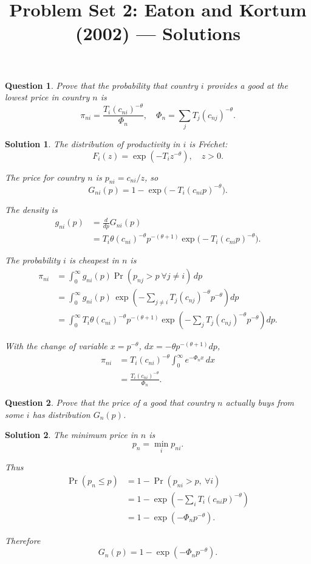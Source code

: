 \documentclass[12pt]{article}
\title{Problem Set 2: Eaton and Kortum (2002) --- Solutions}
\author{}
\date{}
\newtheorem{question}{Question}
\newtheorem*{solution}{Solution}
\begin{document}
\maketitle

\begin{question}
Prove that the probability that country $i$ provides a good at the lowest price in country $n$ is
\[
\pi_{ni} = \frac{T_i (c_{ni})^{-\theta}}{\Phi_n}, \quad
\Phi_n = \sum_j T_j (c_{nj})^{-\theta}.
\]
\end{question}

\begin{solution}
The distribution of productivity in $i$ is Fréchet:
\[
F_i(z) = \exp(-T_i z^{-\theta}), \quad z > 0.
\]

The price for country $n$ is $p_{ni} = c_{ni}/z$, so
\[
G_{ni}(p) = 1 - \exp\!\big(-T_i (c_{ni} p)^{-\theta}\big).
\]

The density is
\begin{align*}
g_{ni}(p) 
&= \frac{d}{dp} G_{ni}(p) \\
&= T_i \theta (c_{ni})^{-\theta} p^{-(\theta+1)} 
    \exp\!\big(-T_i (c_{ni} p)^{-\theta}\big).
\end{align*}

The probability $i$ is cheapest in $n$ is
\begin{align*}
\pi_{ni} &= \int_0^\infty g_{ni}(p) 
    \Pr(p_{nj} > p \ \forall j \neq i)\, dp \\
&= \int_0^\infty g_{ni}(p)\,
    \exp\!\left(-\sum_{j \neq i} T_j (c_{nj})^{-\theta} p^{-\theta}\right) dp \\
&= \int_0^\infty T_i \theta (c_{ni})^{-\theta} p^{-(\theta+1)} 
    \exp\!\left(-\sum_{j} T_j (c_{nj})^{-\theta} p^{-\theta}\right) dp.
\end{align*}

With the change of variable $x = p^{-\theta}$, $dx = -\theta p^{-(\theta+1)} dp$,
\begin{align*}
\pi_{ni} &= T_i (c_{ni})^{-\theta} 
    \int_0^\infty e^{-\Phi_n x} \, dx \\
&= \frac{T_i (c_{ni})^{-\theta}}{\Phi_n}.
\end{align*}
\end{solution}

\begin{question}
Prove that the price of a good that country $n$ actually buys from some $i$ has distribution $G_n(p)$.
\end{question}

\begin{solution}
The minimum price in $n$ is
\[
p_n = \min_i p_{ni}.
\]

Thus
\begin{align*}
\Pr(p_n \leq p) 
&= 1 - \Pr(p_{ni} > p, \ \forall i) \\
&= 1 - \exp\!\left(-\sum_i T_i (c_{ni} p)^{-\theta}\right) \\
&= 1 - \exp(-\Phi_n p^{-\theta}).
\end{align*}

Therefore
\[
G_n(p) = 1 - \exp(-\Phi_n p^{-\theta}).
\]
\end{solution}
\end{document}
